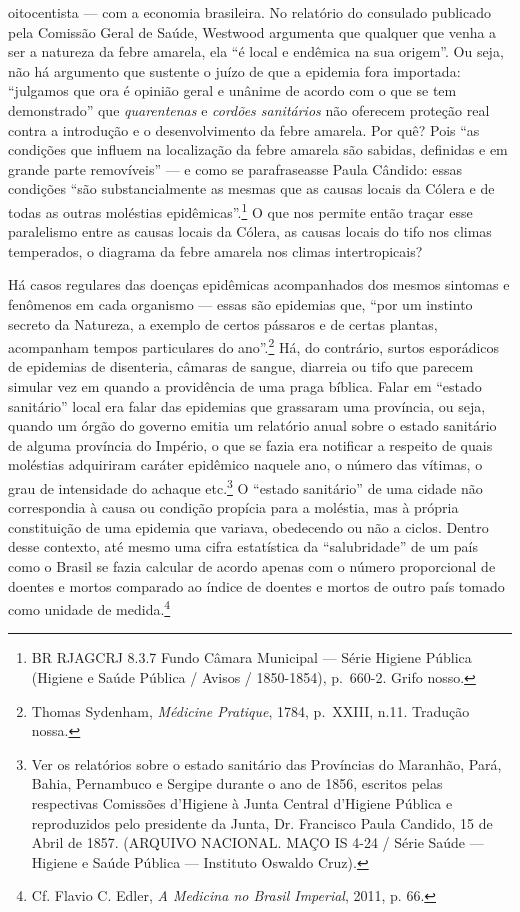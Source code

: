 oitocentista --- com a economia brasileira. No relatório do consulado
publicado pela Comissão Geral de Saúde, Westwood argumenta que qualquer
que venha a ser a natureza da febre amarela, ela ``é local e endêmica na
sua origem''. Ou seja, não há argumento que sustente o juízo de que a
epidemia fora importada: ``julgamos que ora é opinião geral e unânime de
acordo com o que se tem demonstrado'' que \textit{quarentenas} e
\textit{cordões sanitários} não oferecem proteção real contra a introdução
e o desenvolvimento da febre amarela. Por quê? Pois ``as condições que
influem na localização da febre amarela são sabidas, definidas e em
grande parte removíveis'' --- e como se parafraseasse Paula Cândido:
essas condições ``são substancialmente as mesmas que as causas locais da
Cólera e de todas as outras moléstias epidêmicas''.\footnote{BR RJAGCRJ
  8.3.7 Fundo Câmara Municipal --- Série Higiene Pública (Higiene e Saúde
  Pública / Avisos / 1850-1854), p.~660-2. Grifo nosso.} O que nos
permite então traçar esse paralelismo entre as causas locais da Cólera,
as causas locais do tifo nos climas temperados, o diagrama da febre
amarela nos climas intertropicais?

Há casos regulares das doenças epidêmicas acompanhados dos mesmos
sintomas e fenômenos em cada organismo --- essas são epidemias que, ``por
um instinto secreto da Natureza, a exemplo de certos pássaros e de
certas plantas, acompanham tempos particulares do ano''.\footnote{Thomas
  Sydenham, \textit{Médicine Pratique}, 1784, p.~XXIII, n.11. Tradução
  nossa.} Há, do contrário, surtos esporádicos de epidemias de
disenteria, câmaras de sangue, diarreia ou tifo que parecem simular vez
em quando a providência de uma praga bíblica. Falar em ``estado
sanitário'' local era falar das epidemias que grassaram uma província,
ou seja, quando um órgão do governo emitia um relatório anual sobre o
estado sanitário de alguma província do Império, o que se fazia era
notificar a respeito de quais moléstias adquiriram caráter epidêmico
naquele ano, o número das vítimas, o grau de intensidade do achaque
etc.\footnote{Ver os relatórios sobre o estado sanitário das Províncias
  do Maranhão, Pará, Bahia, Pernambuco e Sergipe durante o ano de 1856,
  escritos pelas respectivas Comissões d'Higiene à Junta Central
  d'Higiene Pública e reproduzidos pelo presidente da Junta, Dr.
  Francisco Paula Candido, 15 de Abril de 1857. (ARQUIVO NACIONAL. MAÇO
  IS 4-24 / Série Saúde --- Higiene e Saúde Pública --- Instituto Oswaldo
  Cruz).} O ``estado sanitário'' de uma cidade não correspondia à causa
ou condição propícia para a moléstia, mas à própria constituição de uma
epidemia que variava, obedecendo ou não a ciclos. Dentro desse contexto,
até mesmo uma cifra estatística da ``salubridade'' de um país como o
Brasil se fazia calcular de acordo apenas com o número proporcional de
doentes e mortos comparado ao índice de doentes e mortos de outro país
tomado como unidade de medida.\footnote{Cf. Flavio C. Edler, \textit{A
  Medicina no Brasil Imperial}, 2011, p. 66.}


